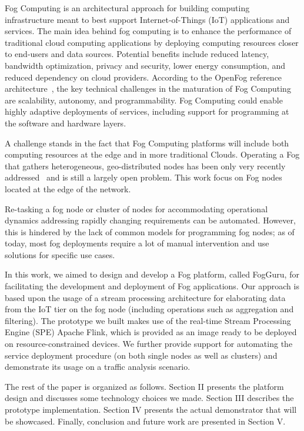 Fog Computing is an architectural approach for building computing infrastructure
meant to best support Internet-of-Things (IoT) applications and services. The
main idea behind fog computing is to enhance the performance of traditional
cloud computing applications by deploying computing
resources closer to end-users and data sources. Potential benefits include
reduced latency, bandwidth optimization, privacy and security, lower energy
consumption, and reduced dependency on
cloud providers. According to the OpenFog reference
architecture~\cite{openfogRA}, the key technical challenges in the maturation of
Fog Computing are scalability, autonomy, and programmability. Fog Computing
could enable highly adaptive deployments of services, including support for
programming at the software and hardware layers. 

A challenge stands in the fact that Fog Computing platforms will include both
computing resources at the edge and in more traditional Clouds. Operating a Fog
that gathers heterogeneous, geo-distributed nodes has been only very recently
addressed~\cite{fogdeploy} and is still a largely open problem. This work focus
on Fog nodes located at the edge of the network.

Re-tasking a fog node or cluster of nodes for accommodating operational dynamics
addressing rapidly changing requirements can be automated. However, this is
hindered by the lack of common models for programming fog nodes; as of today,
most fog deployments require a lot of manual intervention and use solutions for
specific use cases.


In this work, we aimed to design and develop a Fog platform, called FogGuru, for facilitating the development and deployment of Fog applications. Our approach is based upon the usage of a stream processing architecture for elaborating data from the IoT tier on the fog node (including operations such as aggregation and filtering). The prototype we built makes use of the real-time Stream Processing Engine (SPE) Apache Flink, which is provided as an image ready to be deployed on resource-constrained devices. We further provide support for automating the service deployment procedure (on both single nodes as well as clusters) and demonstrate its usage on a traffic analysis scenario.

The rest of the paper is organized as follows. Section II
presents the platform design and discusses some technology choices we made. Section III describes the prototype implementation. Section IV presents the actual demonstrator that will be showcased. Finally, conclusion and future work are presented in Section V.
